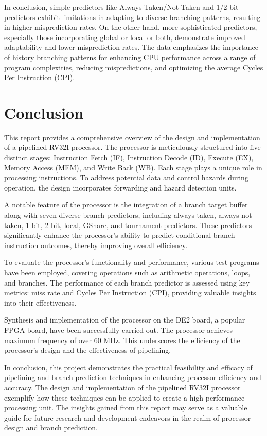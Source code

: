 \documentclass[12pt,a4paper,oneside]{book} %
\begin{document}
In conclusion, simple predictors like Always Taken/Not Taken and 1/2-bit predictors exhibit limitations in adapting to diverse branching patterns, resulting in higher misprediction rates. On the other hand, more sophisticated predictors, especially those incorporating global or local or both, demonstrate improved adaptability and lower misprediction rates. The data emphasizes the importance of history branching patterns for enhancing CPU performance across a range of program complexities, reducing mispredictions, and optimizing the average Cycles Per Instruction (CPI).

\chapter{Conclusion}
This report provides a comprehensive overview of the design and implementation of a pipelined RV32I processor. The processor is meticulously structured into five distinct stages: Instruction Fetch (IF), Instruction Decode (ID), Execute (EX), Memory Access (MEM), and Write Back (WB). Each stage plays a unique role in processing instructions. To address potential data and control hazards during operation, the design incorporates forwarding and hazard detection units.

A notable feature of the processor is the integration of a branch target buffer along with seven diverse branch predictors, including always taken, always not taken, 1-bit, 2-bit, local, GShare, and tournament predictors. These predictors significantly enhance the processor's ability to predict conditional branch instruction outcomes, thereby improving overall efficiency.

To evaluate the processor's functionality and performance, various test programs have been employed, covering operations such as arithmetic operations, loops, and branches. The performance of each branch predictor is assessed using key metrics: miss rate and Cycles Per Instruction (CPI), providing valuable insights into their effectiveness.

Synthesis and implementation of the processor on the DE2 board, a popular FPGA board, have been successfully carried out. The processor achieves maximum frequency of over 60 MHz. This underscores the efficiency of the processor's design and the effectiveness of pipelining.

In conclusion, this project demonstrates the practical feasibility and efficacy of pipelining and branch prediction techniques in enhancing processor efficiency and accuracy. The design and implementation of the pipelined RV32I processor exemplify how these techniques can be applied to create a high-performance processing unit. The insights gained from this report may serve as a valuable guide for future research and development endeavors in the realm of processor design and branch prediction.
\end{document}
